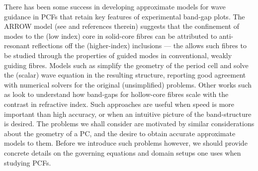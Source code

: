 There has been some success in developing approximate models for wave guidance in PCFs that retain key features of experimental band-gap plots.
The ARROW model (see \cite{laegsgaard2004gap, litchinitser2004application} and references therein) suggests that the confinement of modes to the (low index) core in solid-core fibres can be attributed to anti-resonant reflections off the (higher-index) inclusions --- the allows such fibres to be studied through the properties of guided modes in conventional, weakly guiding fibres.
Models such as \cite{birks2006approximate} simplify the geometry of the period cell and solve the (scalar) wave equation in the resulting structure, reporting good agreement with numerical solvers for the original (unsimplified) problems.
Other works such as \cite{birks2004scaling} look to understand how band-gaps for hollow-core fibres scale with the contrast in refractive index.
Such approaches are useful when speed is more important than high accuracy, or when an intuitive picture of the band-structure is desired.
The problems we shall consider are motivated by similar considerations about the geometry of a PC, and the desire to obtain accurate approximate models to them.
Before we introduce such problems however, we should provide concrete details on the governing equations and domain setups one uses when studying PCFs.